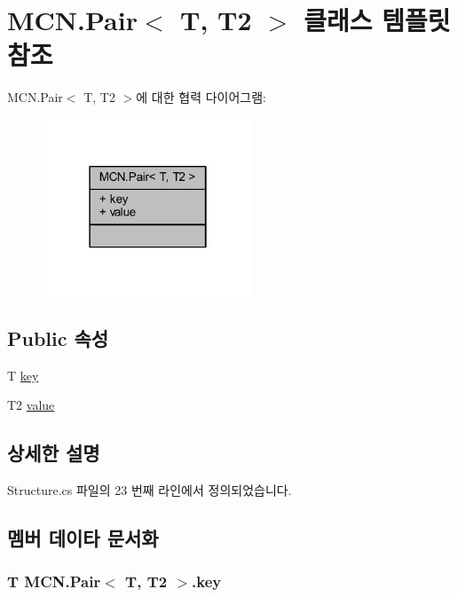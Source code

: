 \hypertarget{class_m_c_n_1_1_pair}{}\section{M\+C\+N.\+Pair$<$ T, T2 $>$ 클래스 템플릿 참조}
\label{class_m_c_n_1_1_pair}


M\+C\+N.\+Pair$<$ T, T2 $>$에 대한 협력 다이어그램\+:
\nopagebreak
\begin{figure}[H]
\begin{center}
\leavevmode
\includegraphics[width=178pt]{class_m_c_n_1_1_pair__coll__graph}
\end{center}
\end{figure}
\subsection*{Public 속성}
\begin{DoxyCompactItemize}
\item 
T \hyperlink{class_m_c_n_1_1_pair_a62c546d3829b8819a65f8c9d64200338}{key}
\item 
T2 \hyperlink{class_m_c_n_1_1_pair_a1980bbf37b60fcbfea22382f71250e84}{value}
\end{DoxyCompactItemize}


\subsection{상세한 설명}


Structure.\+cs 파일의 23 번째 라인에서 정의되었습니다.



\subsection{멤버 데이타 문서화}
\subsubsection[{\texorpdfstring{key}{key}}]{\setlength{\rightskip}{0pt plus 5cm}T {\bf M\+C\+N.\+Pair}$<$ T, T2 $>$.key}\hypertarget{class_m_c_n_1_1_pair_a62c546d3829b8819a65f8c9d64200338}{}\label{class_m_c_n_1_1_pair_a62c546d3829b8819a65f8c9d64200338}


